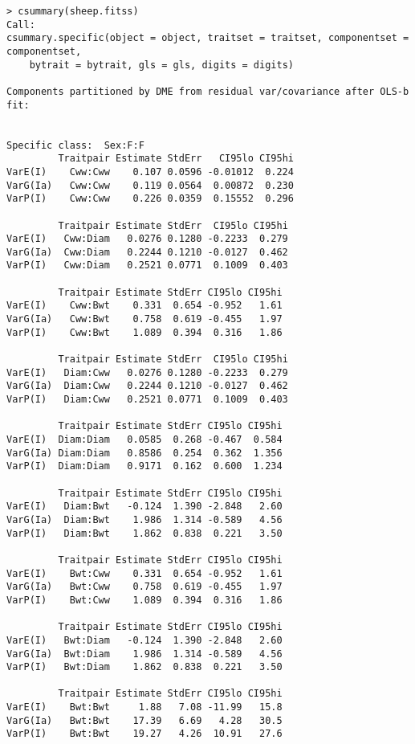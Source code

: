 \documentclass[titlepage]{article}  %
\begin{document}
\begin{verbatim}
> csummary(sheep.fitss)
Call:
csummary.specific(object = object, traitset = traitset, componentset = componentset, 
    bytrait = bytrait, gls = gls, digits = digits)

Components partitioned by DME from residual var/covariance after OLS-b fit:


Specific class:  Sex:F:F 
         Traitpair Estimate StdErr   CI95lo CI95hi
VarE(I)    Cww:Cww    0.107 0.0596 -0.01012  0.224
VarG(Ia)   Cww:Cww    0.119 0.0564  0.00872  0.230
VarP(I)    Cww:Cww    0.226 0.0359  0.15552  0.296

         Traitpair Estimate StdErr  CI95lo CI95hi
VarE(I)   Cww:Diam   0.0276 0.1280 -0.2233  0.279
VarG(Ia)  Cww:Diam   0.2244 0.1210 -0.0127  0.462
VarP(I)   Cww:Diam   0.2521 0.0771  0.1009  0.403

         Traitpair Estimate StdErr CI95lo CI95hi
VarE(I)    Cww:Bwt    0.331  0.654 -0.952   1.61
VarG(Ia)   Cww:Bwt    0.758  0.619 -0.455   1.97
VarP(I)    Cww:Bwt    1.089  0.394  0.316   1.86

         Traitpair Estimate StdErr  CI95lo CI95hi
VarE(I)   Diam:Cww   0.0276 0.1280 -0.2233  0.279
VarG(Ia)  Diam:Cww   0.2244 0.1210 -0.0127  0.462
VarP(I)   Diam:Cww   0.2521 0.0771  0.1009  0.403

         Traitpair Estimate StdErr CI95lo CI95hi
VarE(I)  Diam:Diam   0.0585  0.268 -0.467  0.584
VarG(Ia) Diam:Diam   0.8586  0.254  0.362  1.356
VarP(I)  Diam:Diam   0.9171  0.162  0.600  1.234

         Traitpair Estimate StdErr CI95lo CI95hi
VarE(I)   Diam:Bwt   -0.124  1.390 -2.848   2.60
VarG(Ia)  Diam:Bwt    1.986  1.314 -0.589   4.56
VarP(I)   Diam:Bwt    1.862  0.838  0.221   3.50

         Traitpair Estimate StdErr CI95lo CI95hi
VarE(I)    Bwt:Cww    0.331  0.654 -0.952   1.61
VarG(Ia)   Bwt:Cww    0.758  0.619 -0.455   1.97
VarP(I)    Bwt:Cww    1.089  0.394  0.316   1.86

         Traitpair Estimate StdErr CI95lo CI95hi
VarE(I)   Bwt:Diam   -0.124  1.390 -2.848   2.60
VarG(Ia)  Bwt:Diam    1.986  1.314 -0.589   4.56
VarP(I)   Bwt:Diam    1.862  0.838  0.221   3.50

         Traitpair Estimate StdErr CI95lo CI95hi
VarE(I)    Bwt:Bwt     1.88   7.08 -11.99   15.8
VarG(Ia)   Bwt:Bwt    17.39   6.69   4.28   30.5
VarP(I)    Bwt:Bwt    19.27   4.26  10.91   27.6




\end{verbatim}
\end{document}
